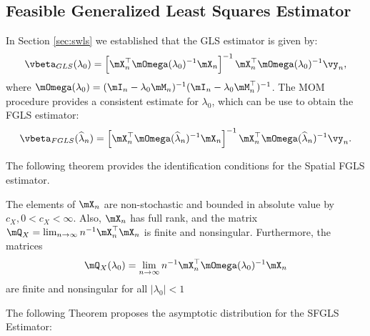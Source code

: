 \subsection{Feasible Generalized Least Squares Estimator}

In Section \ref{sec:swls} we established that the GLS estimator is given by:
\begin{equation}\label{eq:beta_gls_gm}
\vbeta_{GLS}(\lambda_0) =\left[\mX^\top_n\mOmega(\lambda_0)^{-1}\mX_n\right]^{-1}\mX^\top_n\mOmega(\lambda_0)^{-1}\vy_n,
\end{equation}
%
where $\mOmega(\lambda_0) = (\mI_n - \lambda_0\mM_n)^{-1}(\mI_n - \lambda_0\mM^\top_n)^{-1}$. The MOM procedure provides a consistent estimate for $\lambda_0$, which can be use to obtain the FGLS estimator:
\begin{equation}\label{eq:beta_fgls}
\vbeta_{FGLS}(\widehat{\lambda}_n) =\left[\mX^\top_n\mOmega(\widehat{\lambda}_n)^{-1}\mX_n\right]^{-1}\mX^\top_n\mOmega(\widehat{\lambda}_n)^{-1}\vy_n.
\end{equation}

The following theorem provides the identification conditions for the Spatial FGLS estimator.
\begin{assumption}\label{assu:X_bounded_fgls}
  The elements of $\mX_n$ are non-stochastic and bounded in absolute value by $c_X, 0 < c_X < \infty$. Also, $\mX_n$ has full rank, and the matrix $\mQ_X = \lim_{n\to\infty}n^{-1}\mX^\top_n\mX_n$ is finite and nonsingular. Furthermore, the matrices
\begin{equation*}
\mQ_X(\lambda_0) = \lim_{n\to \infty} n^{-1}\mX^\top_n\mOmega(\lambda_0)^{-1}\mX_n 
\end{equation*}
%
are finite and nonsingular for all $\left|\lambda_0\right| < 1$
\end{assumption}

The following Theorem proposes the asymptotic distribution for the SFGLS Estimator:

